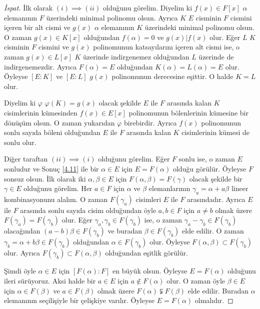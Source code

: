 \documentclass{article}
\theoremstyle{definition}
\theoremstyle{remark}
\begin{document}
    	    \begin{proof}[İspat]
    	        İlk olarak $(i) \implies (ii)$ olduğunu görelim. Diyelim ki $f(x) \in F[x]$ $\alpha$ elemanının $F$ üzerindeki minimal polinomu olsun. Ayrıca $K$ $E$ cisminin $F$ cismini içeren bir alt cismi ve $g(x)$ $\alpha$ elemanının $K$ üzerindeki minimal polinomu olsun. O zaman $g(x) \in K[x]$ olduğundan $f(\alpha) = 0$ ve $g(x) | f(x)$ olur. Eğer $L$ $K$ cisminin $F$ cismini ve $g(x)$ polinomunun katsayılarını içeren alt cismi ise, o zaman $g(x) \in L[x]$ $K$ üzerinde indirgenemez olduğundan $L$ üzerinde de indirgenemezdir. Ayrıca $F(\alpha) = E$ olduğundan $K(\alpha) = L(\alpha) = E$ olur. Öyleyse $[E : K]$ ve $[E : L]$ $g(x)$ polinomunun derecesine eşittir. O halde $K = L$ olur.\par
    	        Diyelim ki $\varphi$ $\varphi(K) = g(x)$ olacak şekilde $E$ ile $F$ arasında kalan $K$ cisimlerinin kümesinden $f(x) \in E[x]$ polinomunun bölenlerinin kümesine bir dönüşüm olsun. O zaman yukarıdan $\varphi$ birebirdir. Ayrıca $f(x)$ polinomunun sonlu sayıda böleni olduğundan $E$ ile $F$ arasında kalan $K$ cisimlerinin kümesi de sonlu olur.\par
    	        Diğer taraftan $(ii) \implies (i)$ olduğunu görelim. Eğer $F$ sonlu ise, o zaman $E$ sonludur ve Sonuç \ref{4.11} ile bir $\alpha \in E$ için $E = F(\alpha)$ olduğu görülür. Öyleyse $F$ sonsuz olsun. İlk olarak iki $\alpha, \beta \in E$ için $F(\alpha, \beta) = F(\gamma)$ olacak şekilde bir $\gamma \in E$ olduğunu görelim. Her $a \in F$ için $\alpha$ ve $\beta$ elemanlarının $\gamma_a = \alpha + a\beta$ lineer kombinasyonunu alalım. O zaman $F(\gamma_a)$ cisimleri $E$ ile $F$ arasındadır. Ayrıca $E$ ile $F$ arasında sonlu sayıda cisim olduğundan öyle $a, b \in F$ için $a \neq b$ olmak üzere $F(\gamma_a) = F(\gamma_b)$ olur. Eğer $\gamma_a, \gamma_b \in F(\gamma_b)$ ise, o zaman $\gamma_a - \gamma_b \in F(\gamma_b)$ olacağından $(a - b)\beta \in F(\gamma_b)$ ve buradan $\beta \in F(\gamma_b)$ elde edilir. O zaman $\gamma_b = \alpha + b\beta \in F(\gamma_b)$ olduğundan $\alpha \in F(\gamma_b)$ olur. Öyleyse $F(\alpha, \beta) \subset F(\gamma_b)$ olur. Ayrıca $F(\gamma_b) \subset F(\alpha, \beta)$ olduğundan eşitlik görülür.\par
    	        Şimdi öyle $\alpha \in E$ için $[F(\alpha) : F]$ en büyük olsun. Öyleyse $E = F(\alpha)$ olduğunu ileri sürüyoruz. Aksi halde bir $a \in E$ için $a \notin F(\alpha)$ olur. O zaman öyle $\beta \in E$ için $\alpha \in F(\beta)$ ve $a \in F(\beta)$ olmak üzere $F(\alpha) \subsetneqq F(\beta)$ elde edilir. Buradan $\alpha$ elemanının seçilişiyle bir çelişkiye varılır. Öyleyse $E = F(\alpha)$ olmalıdır.
    	    \end{proof}
    	    
\end{document}

